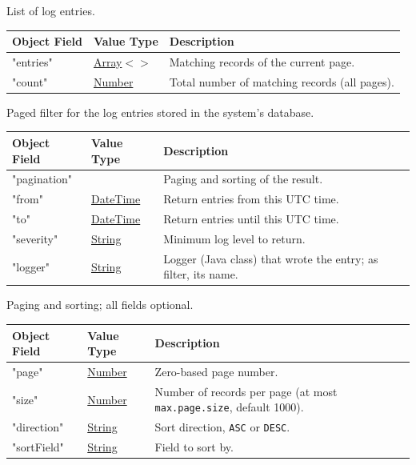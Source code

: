 \documentclass[a4paper]{arrowhead}
\newcommand{\mref}[2][]{{\textcolor{ArrowheadPurple}{\hyperref[sec:model:#2]{\ifstrempty{#1}{#2}{#1}}}}}
\newcommand{\pref}[1]{{\textcolor{ArrowheadGrey}{\hyperref[sec:model:primitives:#1]{#1}}}}
\begin{document}

List of log entries.


\noindent\begin{tabularx}{\textwidth}{| >{\raggedright\arraybackslash}p{3.9cm} | >{\raggedright\arraybackslash\small}p{5.3cm} | X |} \hline
\rowcolor{gray!33} Object Field & Value Type & Description \\ \hline
"entries" & \pref{Array}$<$\allowbreak{}\mref{LogEntry}$>$ & Matching records of the current page. \\ \hline
"count" & \pref{Number} & Total number of matching records (all pages). \\ \hline
\end{tabularx}




Paged filter for the log entries stored in the system's database.


\noindent\begin{tabularx}{\textwidth}{| >{\raggedright\arraybackslash}p{3.9cm} | >{\raggedright\arraybackslash\small}p{5.3cm} | X |} \hline
\rowcolor{gray!33} Object Field & Value Type & Description \\ \hline
"pagination" & \mref{Page} & Paging and sorting of the result. \\ \hline
"from" & \pref{DateTime} & Return entries from this UTC time. \\ \hline
"to" & \pref{DateTime} & Return entries until this UTC time. \\ \hline
"severity" & \pref{String} & Minimum log level to return. \\ \hline
"logger" & \pref{String} & Logger (Java class) that wrote the entry; as filter, its name. \\ \hline
\end{tabularx}




Paging and sorting; all fields optional.


\noindent\begin{tabularx}{\textwidth}{| >{\raggedright\arraybackslash}p{3.9cm} | >{\raggedright\arraybackslash\small}p{5.3cm} | X |} \hline
\rowcolor{gray!33} Object Field & Value Type & Description \\ \hline
"page" & \pref{Number} & Zero-based page number. \\ \hline
"size" & \pref{Number} & Number of records per page (at most \texttt{max.\allowbreak{}page.\allowbreak{}size}, default 1000). \\ \hline
"direction" & \pref{String} & Sort direction, \texttt{ASC} or \texttt{DESC}. \\ \hline
"sort\allowbreak{}Field" & \pref{String} & Field to sort by. \\ \hline
\end{tabularx}
\end{document}
